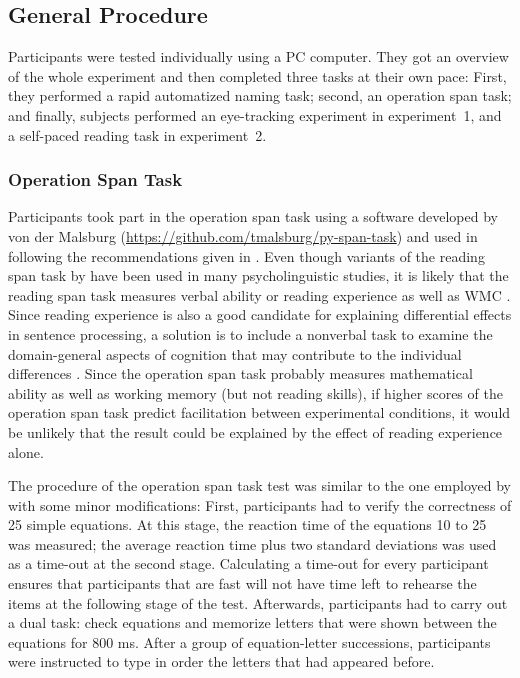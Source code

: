 \documentclass{frontiersSCNS}\usepackage{knitr}
\begin{document}
\subsection{General Procedure}
Participants were tested individually using a PC computer. They got an overview of the whole experiment and then completed three tasks at their own pace: First, they performed a rapid automatized naming task; second,  an operation span task; and finally, subjects performed an eye-tracking experiment in experiment~1, and a self-paced reading task  in experiment~2. 


\subsubsection{Operation Span Task}
Participants took part in the operation span task \citep{TurnerEngle1989} using a software developed by von der Malsburg (\url{https://github.com/tmalsburg/py-span-task}) and used in \citet{vonderMalsburgVasishth2012} following the  recommendations given in \citet{ConwayEtAl2005}. Even though variants of the reading span task by \citet{DanemanCarpenter1980} have been used in many psycholinguistic studies, it is likely that the reading span task measures verbal ability or reading experience as well as WMC \citep{MacDonaldChristiansen2002,ConwayEtAl2005}. Since reading experience is also a good candidate for explaining differential effects in sentence processing, a solution is to include a
nonverbal task to examine the domain-general aspects of cognition that may contribute to the individual differences \citep{SwetsEtAl2007}. Since the operation span task probably measures mathematical ability as well as working memory (but not reading skills),  if higher scores of the operation span task predict facilitation between experimental conditions, it would be unlikely that the result could be explained by the effect of reading experience alone.

 The procedure of the operation span task test was similar to the one employed by \citet{vonderMalsburgVasishth2012} with some minor modifications:
First, participants had to verify the correctness of 25 simple equations. At this stage, the reaction time of the equations 10 to 25 was measured;  the average reaction time plus two standard deviations was used as a time-out at the second stage. Calculating a time-out for every participant ensures that participants that are fast will not have time left to rehearse the items at the following stage of the test.
Afterwards, participants had to carry out  a dual task: check equations and memorize letters that were shown between the equations for 800 ms. After a group of equation-letter successions, participants were instructed to type in order the letters that had   appeared before.
\end{document}
